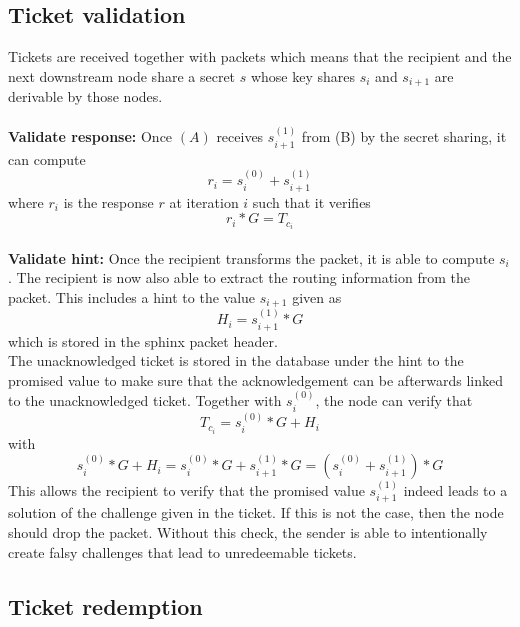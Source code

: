 \subsection{Ticket validation}
Tickets are received together with packets which means that the recipient and the next downstream node share a secret $s$ whose key shares $s_i$ and $s_{i+1}$ are derivable by those nodes.
\\~\\ \textbf{Validate response:} Once $(A)$ receives $s_{i+1}^{(1)}$ from (B) by the secret sharing, it can compute $$r_i=s_i^{(0)}+s_{i+1}^{(1)}$$ where $r_i$ is the response $r$ at iteration $i$ such that it verifies
$$r_i*G=T_{c_i}$$
\\\textbf{Validate hint:} Once the recipient transforms the packet, it is able to compute $s_i$. The recipient is now also able to extract the routing information from the packet.
This includes a hint to the value $s_{i+1}$ given as $$H_i=s_{i+1}^{(1)}*G$$ which is stored in the sphinx packet header.
\\The unacknowledged ticket is stored in the database under the hint to the promised value to make sure that the acknowledgement can be afterwards linked to the unacknowledged ticket.
\newline Together with $s_i^{(0)}$, the node can verify that $$T_{c_i}=s_i^{(0)}*G+H_i$$ with $$s_i^{(0)}*G+H_i=s_i^{(0)}*G+s_{i+1}^{(1)}*G=(s_i^{(0)}+s_{i+1}^{(1)})*G$$
This allows the recipient to verify that the promised value $s_{i+1}^{(1)}$ indeed leads to a solution of the challenge given in the ticket.
If this is not the case, then the node should drop the packet.
\newline Without this check, the sender is able to intentionally create falsy challenges that lead to unredeemable tickets.


\subsection{Ticket redemption}


